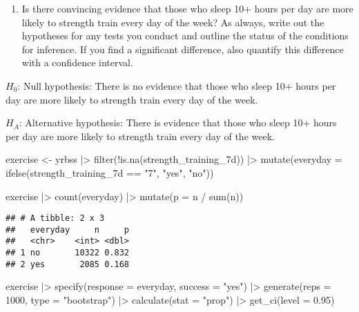 \documentclass[
]{article}
\newenvironment{Shaded}{\begin{snugshade}}{\end{snugshade}}
\newcommand{\AttributeTok}[1]{\textcolor[rgb]{0.77,0.63,0.00}{#1}}
\newcommand{\DecValTok}[1]{\textcolor[rgb]{0.00,0.00,0.81}{#1}}
\newcommand{\FloatTok}[1]{\textcolor[rgb]{0.00,0.00,0.81}{#1}}
\newcommand{\FunctionTok}[1]{\textcolor[rgb]{0.00,0.00,0.00}{#1}}
\newcommand{\NormalTok}[1]{#1}
\newcommand{\OtherTok}[1]{\textcolor[rgb]{0.56,0.35,0.01}{#1}}
\newcommand{\SpecialCharTok}[1]{\textcolor[rgb]{0.00,0.00,0.00}{#1}}
\newcommand{\StringTok}[1]{\textcolor[rgb]{0.31,0.60,0.02}{#1}}
\providecommand{\tightlist}{%
  \setlength{\itemsep}{0pt}\setlength{\parskip}{0pt}}
\begin{document}
\begin{enumerate}
\def\labelenumi{\arabic{enumi}.}
\setcounter{enumi}{8}
\tightlist
\item
  Is there convincing evidence that those who sleep 10+ hours per day
  are more likely to strength train every day of the week? As always,
  write out the hypotheses for any tests you conduct and outline the
  status of the conditions for inference. If you find a significant
  difference, also quantify this difference with a confidence interval.
\end{enumerate}

\(H_{0}\): Null hypothesis: There is no evidence that those who sleep
10+ hours per day are more likely to strength train every day of the
week.

\(H_{A}\): Alternative hypothesis: There is evidence that those who
sleep 10+ hours per day are more likely to strength train every day of
the week.

\begin{Shaded}
\begin{Highlighting}[]
\NormalTok{exercise }\OtherTok{\textless{}{-}}\NormalTok{ yrbss }\SpecialCharTok{|\textgreater{}}
  \FunctionTok{filter}\NormalTok{(}\SpecialCharTok{!}\FunctionTok{is.na}\NormalTok{(strength\_training\_7d)) }\SpecialCharTok{|\textgreater{}}
  \FunctionTok{mutate}\NormalTok{(}\AttributeTok{everyday =} \FunctionTok{ifelse}\NormalTok{(strength\_training\_7d }\SpecialCharTok{==} \StringTok{"7"}\NormalTok{, }\StringTok{"yes"}\NormalTok{, }\StringTok{"no"}\NormalTok{))}

\NormalTok{exercise }\SpecialCharTok{|\textgreater{}}
  \FunctionTok{count}\NormalTok{(everyday) }\SpecialCharTok{|\textgreater{}}
  \FunctionTok{mutate}\NormalTok{(}\AttributeTok{p =}\NormalTok{ n }\SpecialCharTok{/} \FunctionTok{sum}\NormalTok{(n))}
\end{Highlighting}
\end{Shaded}

\begin{verbatim}
## # A tibble: 2 x 3
##   everyday     n     p
##   <chr>    <int> <dbl>
## 1 no       10322 0.832
## 2 yes       2085 0.168
\end{verbatim}

\begin{Shaded}
\begin{Highlighting}[]
\NormalTok{exercise }\SpecialCharTok{|\textgreater{}}
 \FunctionTok{specify}\NormalTok{(}\AttributeTok{response =}\NormalTok{ everyday, }\AttributeTok{success =} \StringTok{"yes"}\NormalTok{) }\SpecialCharTok{|\textgreater{}}
 \FunctionTok{generate}\NormalTok{(}\AttributeTok{reps =} \DecValTok{1000}\NormalTok{, }\AttributeTok{type =} \StringTok{"bootstrap"}\NormalTok{) }\SpecialCharTok{|\textgreater{}}
 \FunctionTok{calculate}\NormalTok{(}\AttributeTok{stat =} \StringTok{"prop"}\NormalTok{) }\SpecialCharTok{|\textgreater{}}
 \FunctionTok{get\_ci}\NormalTok{(}\AttributeTok{level =} \FloatTok{0.95}\NormalTok{)}
\end{Highlighting}
\end{Shaded}
\end{document}
